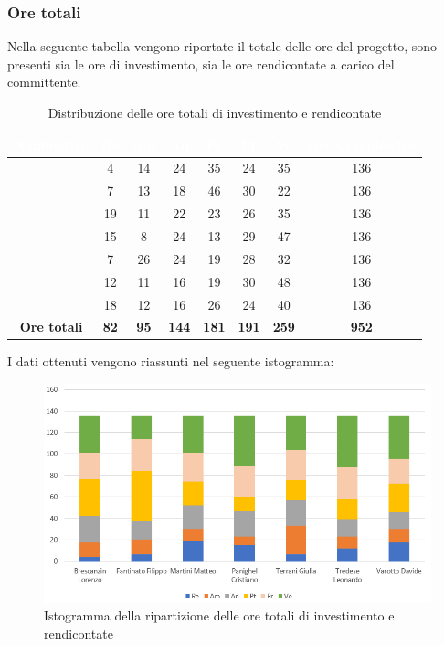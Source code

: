 \subsubsection{Ore totali}
Nella seguente tabella vengono riportate il totale delle ore del progetto, sono presenti sia le ore di investimento, sia le ore rendicontate a carico del committente.
\begin{table}[H]
	\begin{center}
		\begin{tabular}{ |c c c c c c c c| }
		\rowcolor{darkblue} 
		\textcolor{white}{\textbf{Nominativo}} & \textcolor{white}{\textbf{Re}} & \textcolor{white}{\textbf{Am}} & \textcolor{white}{\textbf{An}} & \textcolor{white}{\textbf{Pt}} & \textcolor{white}{\textbf{Pr}} & \textcolor{white}{\textbf{Ve}} & \textcolor{white}{\textbf{Ore Complessive}} \\ \hline
		\BL 	& 4  	& 14  	& 24 	& 35 	& 24 	& 35 	& 136 \\ \hline
		\FF 	& 7 	& 13 	& 18 	& 46 	& 30 	& 22 	& 136 \\ \hline
		\MM 	& 19  	& 11  	& 22 	& 23 	& 26 	& 35  	& 136 \\ \hline
		\PC 	& 15 	& 8  	& 24 	& 13 	& 29	& 47 	& 136 \\ \hline
		\TG 	& 7  	& 26 	& 24 	& 19 	& 28 	& 32 	& 136 \\ \hline
		\TL 	& 12  	& 11 	& 16 	& 19 	& 30 	& 48 	& 136 \\ \hline
		\VD 	& 18  	& 12  	& 16 	& 26 	& 24 	& 40 	& 136 \\ \hline
		\textbf{Ore totali} & \textbf{82} & \textbf{95} & \textbf{144} & \textbf{181} & \textbf{191} & \textbf{259} & \textbf{952} \\ \hline
		\end{tabular}
	\caption{Distribuzione delle ore totali di investimento e rendicontate}
	\end{center}
\end{table}
I dati ottenuti vengono riassunti nel seguente istogramma:
\begin{figure}[H]
    \centering
    \includegraphics[scale = 0.70]{Immagini/TotaleIsto.png}
    \caption{Istogramma della ripartizione delle ore totali di investimento e rendicontate}
    \label{fig:Istogramma ripartizione ore totali di investimento e rendicontate }
\end{figure}
